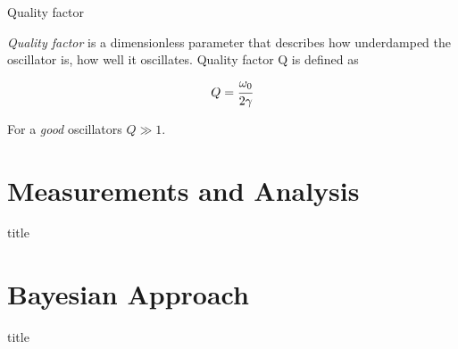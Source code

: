 \documentclass{beamer}
\begin{document}


\begin{frame}{Quality factor}
\begin{definition}
    	\textit{Quality factor} is a dimensionless parameter that describes how underdamped the oscillator is, how well it oscillates. Quality factor Q is defined as
	\begin{equation}\label{eq:q-factor}
	Q=\cfrac{\omega_0}{2\gamma}
	\end{equation}
\end{definition}

\bigskip
For a \textit{good} oscillators $Q \gg 1$. 
\end{frame}



\section{Measurements and Analysis}

\begin{frame}{}
\begin{beamercolorbox}[sep=8pt,center,shadow=true,rounded=true]{title}
    \par%
\end{beamercolorbox}
    
\end{frame}




\section{Bayesian Approach}



\begin{frame}{}
\begin{beamercolorbox}[sep=8pt,center,shadow=true,rounded=true]{title}
    \par%
\end{beamercolorbox}
    
\end{frame}
\end{document}

